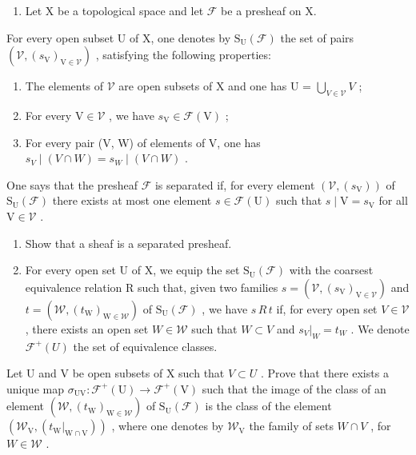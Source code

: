 \begin{enumerate}
\def\labelenumi{\arabic{enumi})}
\setcounter{enumi}{3}
\tightlist
\item
  Let X be a topological space and let \(\mathcal{F}\) be a presheaf on X.
\end{enumerate}

For every open subset U of X, one denotes by \(\mathrm{S}_{\mathrm{U}}(\mathcal{F})\) the set of pairs \((\mathcal{V}, (s_{\mathrm{V}})_{\mathrm{V} \in \mathcal{V}})\) , satisfying the following properties:

\begin{enumerate}
\def\labelenumi{(\roman{enumi})}
\item
  The elements of \(\mathcal{V}\) are open subsets of X and one has U = \(\bigcup_{V\in\mathcal{V}}V\) ;
\item
  For every \(\mathrm{V} \in \mathcal{V}\) , we have \(s_{\mathrm{V}} \in \mathcal{F}(\mathrm{V})\) ;
\item
  For every pair (V, W) of elements of V, one has \(s_{V} \mid (V \cap W) = s_{W} \mid (V \cap W)\) .
\end{enumerate}

One says that the presheaf \(\mathcal{F}\) is separated if, for every element \((\mathcal{V},(s_{\mathrm{V}}))\) of \(\mathrm{S_U}(\mathcal{F})\) there exists at most one element \(s\in \mathcal{F}(\mathrm{U})\) such that \(s\mid \mathrm{V} = s_{\mathrm{V}}\) for all \(\mathrm{V}\in \mathcal{V}\) .

\begin{enumerate}
\def\labelenumi{\alph{enumi})}
\item
  Show that a sheaf is a separated presheaf.
\item
  For every open set U of X, we equip the set \(\mathrm{S}_{\mathrm{U}}(\mathcal{F})\) with the coarsest equivalence relation R such that, given two families \(s = (\mathcal{V}, (s_{\mathrm{V}})_{\mathrm{V} \in \mathcal{V}})\) and \(t = (\mathcal{W}, (t_{\mathrm{W}})_{\mathrm{W} \in \mathcal{W}})\) of \(\mathrm{S}_{\mathrm{U}}(\mathcal{F})\) , we have \(s\,R\,t\) if, for every open set \(V \in \mathcal{V}\) , there exists an open set \(W \in \mathcal{W}\) such that \(W \subset V\) and \(s_{V}|_{W} = t_{W}\) . We denote \(\mathcal{F}^{+}(U)\) the set of equivalence classes.
\end{enumerate}

Let U and V be open subsets of X such that \(V \subset U\) . Prove that there exists a unique map \(\sigma_{\mathrm{UV}}: \mathcal{F}^{+}(\mathrm{U}) \to \mathcal{F}^{+}(\mathrm{V})\) such that the image of the class of an element \((\mathcal{W}, (t_{\mathrm{W}})_{\mathrm{W} \in \mathcal{W}})\) of \(\mathrm{S}_{\mathrm{U}}(\mathcal{F})\) is the class of the element \((\mathcal{W}_{\mathrm{V}}, (t_{\mathrm{W}}|_{\mathrm{W} \cap \mathrm{V}}))\) , where one denotes by \(\mathcal{W}_{\mathrm{V}}\) the family of sets \(W \cap V\) , for \(W \in \mathcal{W}\) .

